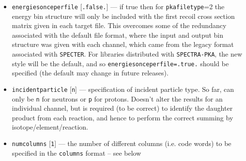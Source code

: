 \documentclass[a4paper]{article}
\begin{document}
\begin{itemize}
\item \texttt{energies{\textunderscore}once{\textunderscore}perfile} [\texttt{.false.}] --- if true then for   \texttt{pka{\textunderscore}filetype}=2 the energy bin structure will only be included with the first recoil cross section matrix given in each target file. This overcomes some of the redundancy associated with the default file format, where the input and output bin structure was given with each channel, which came from the legacy format associated with \texttt{SPECTER}. For libraries distributed with \texttt{SPECTRA-PKA}, the new style will be the default, and so \texttt{energies{\textunderscore}once{\textunderscore}perfile=.true.} should be specified (the default may change in future releases).
\item \texttt{incident{\textunderscore}particle} [\texttt{n}] --- specification of incident particle type. So far, can only be \texttt{n} for neutrons or \texttt{p} for protons. Doesn't alter the results for an individual channel, but is required (to be correct) to identify the daughter product from each reaction, and hence to perform the correct summing by isotope/element/reaction.
\item \texttt{num{\textunderscore}columns} [\texttt{1}] --- the number of different columns (i.e. code words) to be specified in the \texttt{columns} format -- see below

\end{itemize}
\end{document}
